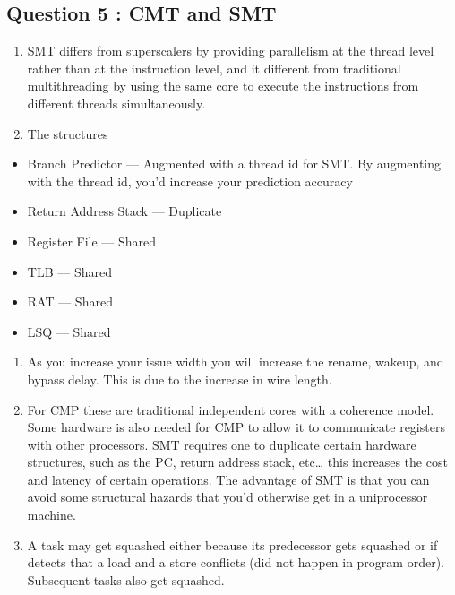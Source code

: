\subsection{Question 5 : CMT and SMT}\label{question-5-cmt-and-smt}

\begin{enumerate}
\def\labelenumi{\alph{enumi}.}
\item
  SMT differs from superscalers by providing parallelism at the thread
  level rather than at the instruction level, and it different from
  traditional multithreading by using the same core to execute the
  instructions from different threads simultaneously.
\item
  The structures
\end{enumerate}

\begin{itemize}
\itemsep1pt\parskip0pt
\item
  Branch Predictor --- Augmented with a thread id for SMT. By augmenting
  with the thread id, you'd increase your prediction accuracy
\item
  Return Address Stack --- Duplicate
\item
  Register File --- Shared
\item
  TLB --- Shared
\item
  RAT --- Shared
\item
  LSQ --- Shared
\end{itemize}

\begin{enumerate}
\def\labelenumi{\alph{enumi}.}
\setcounter{enumi}{2}
\item
  As you increase your issue width you will increase the rename, wakeup,
  and bypass delay. This is due to the increase in wire length.
\item
  For CMP these are traditional independent cores with a coherence
  model. Some hardware is also needed for CMP to allow it to communicate
  registers with other processors. SMT requires one to duplicate certain
  hardware structures, such as the PC, return address stack, etc\ldots{}
  this increases the cost and latency of certain operations. The
  advantage of SMT is that you can avoid some structural hazards that
  you'd otherwise get in a uniprocessor machine.
\item
  A task may get squashed either because its predecessor gets squashed
  or if detects that a load and a store conflicts (did not happen in
  program order). Subsequent tasks also get squashed.
\end{enumerate}
